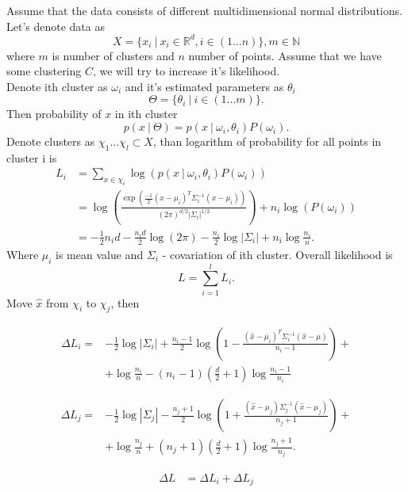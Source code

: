 \documentclass[a4paper, 12pt]{article}
\theoremstyle{definition}
\theoremstyle{definition}
\theoremstyle{remark}
\begin{document}
Assume that the data consists of different multidimensional normal distributions. \\
Let's denote data as  
$$X = \{x_i \:|\: x_i \in \mathbb{R}^d, i \in \left( 1 \ldots n \right) \}, m \in \mathbb{N}$$
where $m$ is number of clusters and $n$ number of points. 
Assume that we have some clustering $C$, we will try to increase it's likelihood. \\
Denote ith cluster as $\omega_i$ and it's estimated parameters as $\theta_i$
$$ \Theta = \{ \theta_i \:|\: i \in (1 \ldots m)\}.$$
Then probability of $x$ in ith cluster
$$ p(x \:|\: \Theta) = p(x \:|\: \omega_i, \theta_i) P(\omega_i).$$
Denote clusters as $ \chi_1 \ldots \chi_l \subset X $, 
than logarithm of probability for all points in cluster i is 
\begin{align*}
    L_i &= \sum_{x \in \chi_i} \log(p(x \:|\: \omega_i, \theta_i)P(\omega_i)) \\
        &=  \log \left( 
        \frac{ \exp \left( \frac{-1}{2} (x - \mu_i)^T \Sigma_i^{-1} (x - \mu_i) \right) }
        {(2 \pi)^{d/2} |\Sigma_i| ^ {1/2}}
        \right) + n_i \log(P(\omega_i)) \\
        &= -\frac{1}{2} n_i d - \frac{n_i d}{2} \log(2 \pi) - \frac{n_i}{2} \log |\Sigma_i| + n_i \log \frac{n_i}{n}.
\end{align*} 
Where $\mu_i$ is mean value and $\Sigma_i$ - covariation of ith cluster.
Overall likelihood is 
$$ L = \sum_{i = 1}^l L_i.$$
Move $\hat{x}$ from $\chi_i$ to $\chi_j$, then

\begin{align*}
    \Delta L_i = &-\frac{1}{2} \log |\Sigma_i| + \frac{n_i - 1}{2} 
        \log \left(1 - \frac{(\hat{x} - \mu_i)^T \Sigma_i^{-1}(\hat{x} - \mu)}{n_i - 1} \right) + \\
         &+ \log \frac{n_i}{n} - (n_i - 1)(\frac{d}{2} + 1) \log \frac{n_i - 1}{n_i}
\end{align*}

\begin{align*}
    \Delta L_j = &-\frac{1}{2} \log |\Sigma_j| - \frac{n_j + 1}{2} 
        \log \left(1 + \frac{(\hat{x} - \mu_j) \Sigma_j^{-1} (\hat{x} - \mu_j)}{n_j + 1}\right) + \\
         &+ \log \frac{n_j}{n} + (n_j + 1)(\frac{d}{2} + 1) \log \frac{n_j + 1}{n_j}.
\end{align*}

\begin{align*}
    \Delta L &= \Delta L_i + \Delta L_j
\end{align*}
\end{document}
